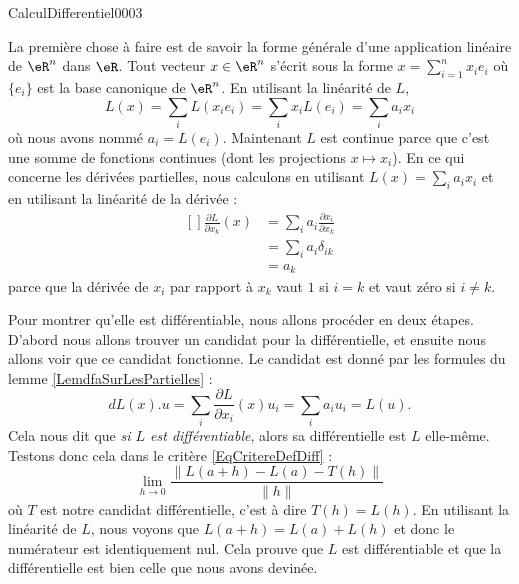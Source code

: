 \begin{corrige}{CalculDifferentiel0003}

	La première chose à faire est de savoir la forme générale d'une application linéaire de $\eR^n$ dans $\eR$. Tout vecteur $x\in\eR^n$ s'écrit sous la forme $x=\sum_{i=1}^nx_ie_i$ où $\{ e_i\}$ est la base canonique de $\eR^n$. En utilisant la linéarité de $L$,
	\begin{equation}
		L(x)=\sum_i L(x_ie_i)=\sum_ix_iL(e_i)=\sum_i a_ix_i
	\end{equation}
	où nous avons nommé $a_i=L(e_i)$. Maintenant $L$ est continue parce que c'est une somme de fonctions continues (dont les projections $x\mapsto x_i$). En ce qui concerne les dérivées partielles, nous calculons en utilisant $L(x)=\sum_ia_ix_i$ et en utilisant la linéarité de la dérivée :
	\begin{equation}
		\begin{aligned}[]
			\frac{ \partial L }{ \partial x_k }(x)&=\sum_ia_i\frac{ \partial x_i }{ \partial x_k }\\
			&=\sum_ia_i\delta_{ik}\\
			&=a_k
		\end{aligned}
	\end{equation}
	parce que la dérivée de $x_i$ par rapport à $x_k$ vaut $1$ si $i=k$ et vaut zéro si $i\neq k$.

	Pour montrer qu'elle est différentiable, nous allons procéder en deux étapes. D'abord nous allons trouver un candidat pour la différentielle, et ensuite nous allons voir que ce candidat fonctionne. Le candidat est donné par les formules du lemme \ref{LemdfaSurLesPartielles} :
	\begin{equation}
		dL(x).u=\sum_i\frac{ \partial L }{ \partial x_i }(x)u_i=\sum_ia_iu_i=L(u).
	\end{equation}
	Cela nous dit que \emph{si $L$ est différentiable}, alors sa différentielle est $L$ elle-même. Testons donc cela dans le critère \eqref{EqCritereDefDiff} :
	\begin{equation}
		\lim_{h\to 0} \frac{ \| L(a+h)-L(a)-T(h) \| }{ \| h \| }
	\end{equation}
	où $T$ est notre candidat différentielle, c'est à dire $T(h)=L(h)$. En utilisant la linéarité de $L$, nous voyons que $L(a+h)=L(a)+L(h)$ et donc le numérateur est identiquement nul. Cela prouve que $L$ est différentiable et que la différentielle est bien celle que nous avons devinée.

\end{corrige}
